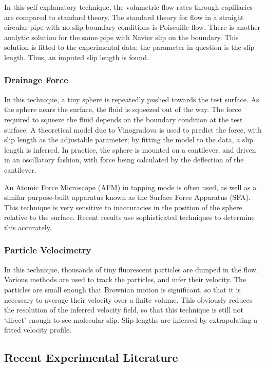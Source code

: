 \documentclass[12pt, a4paper, twoside, openright]{book}
\begin{document}
In this self-explanatory technique, the volumetric flow rates through capillaries are compared to standard theory.  The standard theory for flow in a straight circular pipe with no-slip boundary conditions is Poiseuille flow.  There is another analytic solution for the same pipe with Navier slip on the boundary. This solution is fitted to the experimental data; the parameter in question is the slip length.  Thus, an imputed slip length is found.

\subsubsection{Drainage Force}

In this technique, a tiny sphere is repeatedly pushed towards the test surface. As the sphere nears the surface, the fluid is squeezed out of the way.  The force required to squeeze the fluid depends on the boundary condition at the test surface.  A theoretical model due to Vinogradova \cite{Vinogradova1995} is used to predict the force, with slip length as the adjustable parameter; by fitting the model to the data, a slip length is inferred. In practice, the sphere is mounted on a cantilever, and driven in an oscillatory fashion, with force being calculated by the deflection of the cantilever.

An Atomic Force Microscope (AFM) in tapping mode is often used, as well as a similar purpose-built apparatus known as the Surface Force Apparatus (SFA).  This technique is very sensitive to inaccuracies in the position of the sphere relative to the surface.  Recent results use sophisticated techniques to determine this accurately.

\subsubsection{Particle Velocimetry}

In this technique, thousands of tiny fluorescent particles are dumped in the flow.  Various methods are used to track the particles, and infer their velocity.  The particles are small enough that Brownian motion is significant, so that it is necessary to average their velocity over a finite volume.  This obviously reduces the resolution of the inferred velocity field, so that this technique is still not `direct' enough to see molecular slip. Slip lengths are inferred by extrapolating a fitted velocity profile.

\subsection{Recent Experimental Literature}
\end{document}
